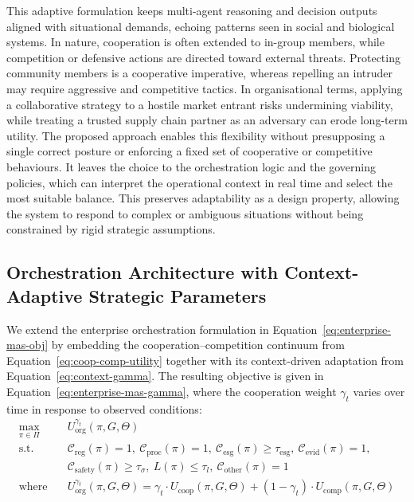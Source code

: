 \documentclass[oneside,10pt]{swissi}
\begin{document}
This adaptive formulation keeps multi-agent reasoning and decision outputs aligned with situational demands, echoing patterns seen in social and biological systems. In nature, cooperation is often extended to in-group members, while competition or defensive actions are directed toward external threats. Protecting community members is a cooperative imperative, whereas repelling an intruder may require aggressive and competitive tactics. In organisational terms, applying a collaborative strategy to a hostile market entrant risks undermining viability, while treating a trusted supply chain partner as an adversary can erode long-term utility. The proposed approach enables this flexibility without presupposing a single correct posture or enforcing a fixed set of cooperative or competitive behaviours. It leaves the choice to the orchestration logic and the governing policies, which can interpret the operational context in real time and select the most suitable balance. This preserves adaptability as a design property, allowing the system to respond to complex or ambiguous situations without being constrained by rigid strategic assumptions.

\subsection{Orchestration Architecture with Context-Adaptive Strategic Parameters}
\label{subsec:orchestration-gamma}

We extend the enterprise orchestration formulation in Equation~\eqref{eq:enterprise-mas-obj} by embedding the cooperation–competition continuum from Equation~\eqref{eq:coop-comp-utility} together with its context-driven adaptation from Equation~\eqref{eq:context-gamma}. The resulting objective is given in Equation~\eqref{eq:enterprise-mas-gamma}, where the cooperation weight $\gamma_t$ varies over time in response to observed conditions:
\begin{align}
\max_{\pi \in \Pi} \quad & U_{\text{org}}^{\gamma_t}(\pi, G, \Theta) \label{eq:enterprise-mas-gamma} \\
\text{s.t.} \quad &
\mathcal{C}_{\text{reg}}(\pi) = 1,\
\mathcal{C}_{\text{proc}}(\pi) = 1,\
\mathcal{C}_{\text{esg}}(\pi) \geq \tau_{\text{esg}},\
\mathcal{C}_{\text{evid}}(\pi) = 1, \nonumber \\
& \mathcal{C}_{\text{safety}}(\pi) \geq \tau_{\sigma},\
L(\pi) \leq \tau_l,\
\mathcal{C}_{\text{other}}(\pi) = 1 \nonumber \\
\text{where} \quad &
U_{\text{org}}^{\gamma_t}(\pi, G, \Theta) =
\gamma_t \cdot U_{\text{coop}}(\pi, G, \Theta)
+ (1 - \gamma_t) \cdot U_{\text{comp}}(\pi, G, \Theta) \nonumber
\end{align}
\end{document}
